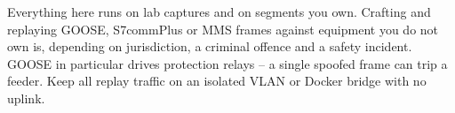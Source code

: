 \documentclass[11pt,a4paper]{article}
\begin{document}
\begin{warnbox}
Everything here runs on lab captures and on segments you own. Crafting and
replaying GOOSE, S7commPlus or MMS frames against equipment you do not own
is, depending on jurisdiction, a criminal offence and a safety incident.
GOOSE in particular drives protection relays -- a single spoofed frame can
trip a feeder. Keep all replay traffic on an isolated VLAN or Docker
bridge with no uplink.
\end{warnbox}
\end{document}
